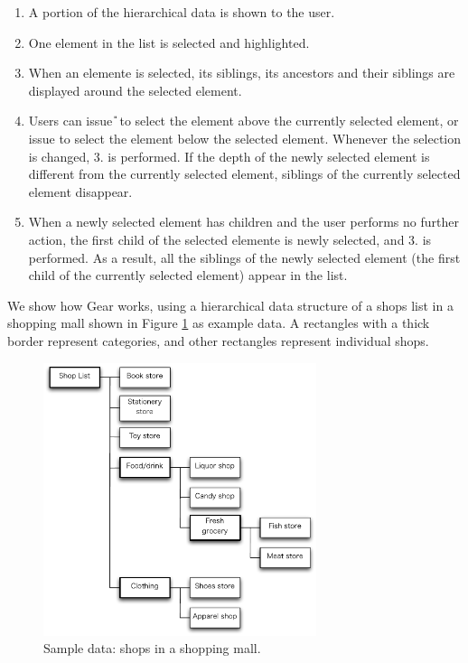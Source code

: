 \documentclass{article}
\begin{document}
\begin{enumerate}
\item A portion of the hierarchical data is shown to the user.

\item One element in the list is selected and highlighted.


\item When an elemente is selected, its siblings, its ancestors and their siblings are displayed
around the selected element.

\item Users can issue {\U} to select the element above the currently selected element,
or issue {\D} to select the element below the selected element.
Whenever the selection is changed, 3. is performed.
If the depth of the newly selected element is different from the currently
selected element, siblings of the currently selected element disappear.

\item When a newly selected element has children and the user performs no further action,
the first child of the selected elemente is newly selected, and 3. is performed.
As a result, all the siblings of the newly selected element
(the first child of the currently selected element) appear in the list.

\end{enumerate}

We show how Gear works, using a hierarchical data structure of
a shops list in a shopping mall shown in Figure \ref{fig1} as example data.
A rectangles with a thick border represent categories, and
other rectangles represent individual shops.

\begin{figure}[H]
\centerline{\includegraphics[width=80mm,bb=0 0 490 490]{figures/fig1.pdf}}
\caption{Sample data: shops in a shopping mall.}
\label{fig1}
\end{figure}
\end{document}

